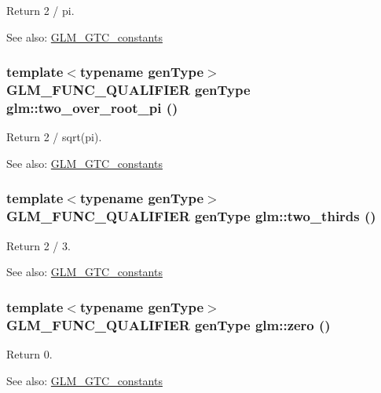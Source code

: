 Return 2 / pi. \begin{Desc}
\item[See also:]\hyperlink{group__gtc__constants}{GLM\_\-GTC\_\-constants} \end{Desc}
\hypertarget{group__gtc__constants_g542f9a504c7cf25b6c0108adb4a9f97a}{
\subsubsection[two\_\-over\_\-root\_\-pi]{\setlength{\rightskip}{0pt plus 5cm}template$<$typename genType$>$ GLM\_\-FUNC\_\-QUALIFIER genType glm::two\_\-over\_\-root\_\-pi ()}}
\label{group__gtc__constants_g542f9a504c7cf25b6c0108adb4a9f97a}


Return 2 / sqrt(pi). \begin{Desc}
\item[See also:]\hyperlink{group__gtc__constants}{GLM\_\-GTC\_\-constants} \end{Desc}
\hypertarget{group__gtc__constants_g846874e34295fed917708f134f754ae4}{
\subsubsection[two\_\-thirds]{\setlength{\rightskip}{0pt plus 5cm}template$<$typename genType$>$ GLM\_\-FUNC\_\-QUALIFIER genType glm::two\_\-thirds ()}}
\label{group__gtc__constants_g846874e34295fed917708f134f754ae4}


Return 2 / 3. \begin{Desc}
\item[See also:]\hyperlink{group__gtc__constants}{GLM\_\-GTC\_\-constants} \end{Desc}
\hypertarget{group__gtc__constants_g888d199297a924864bc2235f5133c30f}{
\subsubsection[zero]{\setlength{\rightskip}{0pt plus 5cm}template$<$typename genType$>$ GLM\_\-FUNC\_\-QUALIFIER genType glm::zero ()}}
\label{group__gtc__constants_g888d199297a924864bc2235f5133c30f}


Return 0. \begin{Desc}
\item[See also:]\hyperlink{group__gtc__constants}{GLM\_\-GTC\_\-constants} \end{Desc}
